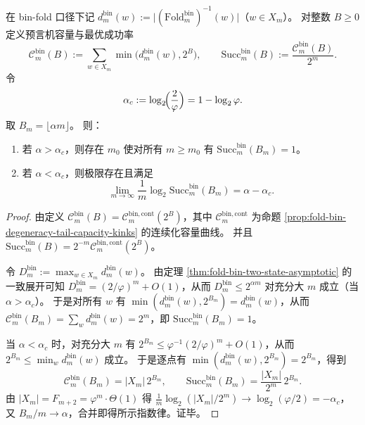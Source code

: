 \begin{theorem}\label{thm:fold-bin-oracle-linear-threshold-exponent}
在 bin-fold 口径下记 \(d^{\mathrm{bin}}_m(w):=\bigl|(\mathrm{Fold}^{\mathrm{bin}}_m)^{-1}(w)\bigr|\)（\(w\in X_m\)）。
对整数 \(B\ge 0\) 定义预言机容量与最优成功率
\[
\mathcal C^{\mathrm{bin}}_m(B):=\sum_{w\in X_m}\min\bigl(d^{\mathrm{bin}}_m(w),2^B\bigr),
\qquad
\mathrm{Succ}^{\mathrm{bin}}_m(B):=\frac{\mathcal C^{\mathrm{bin}}_m(B)}{2^m}.
\]
令
\[
\alpha_c:=\log_2\!\Bigl(\frac{2}{\varphi}\Bigr)=1-\log_2\varphi.
\]
取 \(B_m=\lfloor \alpha m\rfloor\)。
则：
\begin{enumerate}
  \item 若 \(\alpha>\alpha_c\)，则存在 \(m_0\) 使对所有 \(m\ge m_0\) 有 \(\mathrm{Succ}^{\mathrm{bin}}_m(B_m)=1\)。
  \item 若 \(\alpha<\alpha_c\)，则极限存在且满足
  \[
  \lim_{m\to\infty}\frac{1}{m}\log_2 \mathrm{Succ}^{\mathrm{bin}}_m(B_m)=\alpha-\alpha_c.
  \]
\end{enumerate}
\end{theorem}
\begin{proof}
由定义 \(\mathcal C_m^{\mathrm{bin}}(B)=\mathcal C_m^{\mathrm{bin,cont}}(2^B)\)，其中 \(\mathcal C_m^{\mathrm{bin,cont}}\) 为命题 \ref{prop:fold-bin-degeneracy-tail-capacity-kinks} 的连续化容量曲线。
并且 \(\mathrm{Succ}^{\mathrm{bin}}_m(B)=2^{-m}\mathcal C_m^{\mathrm{bin,cont}}(2^B)\)。
\par
令 \(D^{\mathrm{bin}}_m:=\max_{w\in X_m}d_m^{\mathrm{bin}}(w)\)。
由定理 \ref{thm:fold-bin-two-state-asymptotic} 的一致展开可知
\(
D^{\mathrm{bin}}_m=(2/\varphi)^m+O(1)
\)，从而 \(D^{\mathrm{bin}}_m\le 2^{\alpha m}\) 对充分大 \(m\) 成立（当 \(\alpha>\alpha_c\)）。
于是对所有 \(w\) 有 \(\min(d_m^{\mathrm{bin}}(w),2^{B_m})=d_m^{\mathrm{bin}}(w)\)，从而
\(
\mathcal C_m^{\mathrm{bin}}(B_m)=\sum_w d_m^{\mathrm{bin}}(w)=2^m
\)，即 \(\mathrm{Succ}^{\mathrm{bin}}_m(B_m)=1\)。
\par
当 \(\alpha<\alpha_c\) 时，对充分大 \(m\) 有 \(2^{B_m}\le \varphi^{-1}(2/\varphi)^m+O(1)\)，从而 \(2^{B_m}\le \min_w d_m^{\mathrm{bin}}(w)\) 成立。
于是逐点有 \(\min(d_m^{\mathrm{bin}}(w),2^{B_m})=2^{B_m}\)，得到
\[
\mathcal C_m^{\mathrm{bin}}(B_m)=|X_m|\,2^{B_m},
\qquad
\mathrm{Succ}^{\mathrm{bin}}_m(B_m)=\frac{|X_m|}{2^m}\,2^{B_m}.
\]
由 \(|X_m|=F_{m+2}=\varphi^m\cdot \Theta(1)\) 得
\(
\frac{1}{m}\log_2(|X_m|/2^m)\to \log_2(\varphi/2)=-\alpha_c
\)，
又 \(B_m/m\to \alpha\)，合并即得所示指数律。证毕。
\end{proof}

